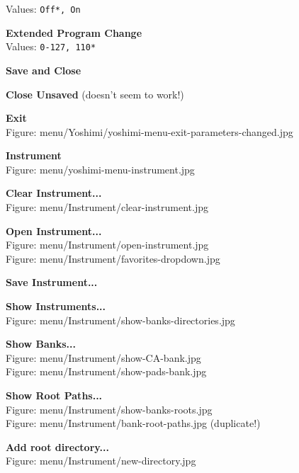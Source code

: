 \documentclass[
 11pt,
 twoside,
 a4paper,
 headinclude,
 footinclude,
 final                                 %
]{article}
\begin{document}
\begin{enumber}
\begin{enumber}
\begin{enumber}
\begin{enumber}
\begin{enumber}
                  Values: \texttt{Off*, On}
               \item \textbf{Extended Program Change} \\
                  Values: \texttt{0-127, 110*}
               \item \textbf{Save and Close}
               \item \textbf{Close Unsaved} (doesn't seem to work!)
            \end{enumber}
         \end{enumber}
         \item \textbf{Exit} \\
            Figure: menu/Yoshimi/yoshimi-menu-exit-parameters-changed.jpg
      \end{enumber}                    %
      \item \textbf{Instrument}  \\
         Figure: menu/yoshimi-menu-instrument.jpg
      \begin{enumber}
         \item \textbf{Clear Instrument...} \\
            Figure: menu/Instrument/clear-instrument.jpg
         \item \textbf{Open Instrument...} \\
            Figure: menu/Instrument/open-instrument.jpg \\
            Figure: menu/Instrument/favorites-dropdown.jpg
         \item \textbf{Save Instrument...}
         \item \textbf{Show Instruments...} \\
            Figure: menu/Instrument/show-banks-directories.jpg
         \item \textbf{Show Banks...} \\
            Figure: menu/Instrument/show-CA-bank.jpg \\
            Figure: menu/Instrument/show-pads-bank.jpg
         \item \textbf{Show Root Paths...} \\
            Figure: menu/Instrument/show-banks-roots.jpg \\
            Figure: menu/Instrument/bank-root-paths.jpg (duplicate!)
            \begin{enumber}
               \item \textbf{Add root directory...} \\
                  Figure: menu/Instrument/new-directory.jpg

\end{enumber}
\end{enumber}
\end{enumber}
\end{enumber}
\end{document}
